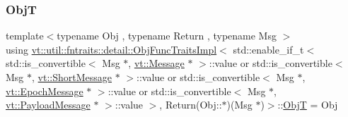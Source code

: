\subsubsection{\texorpdfstring{ObjT}{ObjT}}
{\footnotesize\ttfamily template$<$typename Obj , typename Return , typename Msg $>$ \\
using \hyperlink{structvt_1_1util_1_1fntraits_1_1detail_1_1_obj_func_traits_impl}{vt\+::util\+::fntraits\+::detail\+::\+Obj\+Func\+Traits\+Impl}$<$ std\+::enable\+\_\+if\+\_\+t$<$ std\+::is\+\_\+convertible$<$ Msg $\ast$, \hyperlink{namespacevt_a3a3ddfef40b4c90915fa43cdd5f129ea}{vt\+::\+Message} $\ast$ $>$\+::value or std\+::is\+\_\+convertible$<$ Msg $\ast$, \hyperlink{namespacevt_a1125ac1da6c0bbf141e0ea0739d7602d}{vt\+::\+Short\+Message} $\ast$ $>$\+::value or std\+::is\+\_\+convertible$<$ Msg $\ast$, \hyperlink{namespacevt_ad67368ffae52d7325002586b41bb150e}{vt\+::\+Epoch\+Message} $\ast$ $>$\+::value or std\+::is\+\_\+convertible$<$ Msg $\ast$, \hyperlink{namespacevt_a89a92229c5622b855c02c549f83a1a68}{vt\+::\+Payload\+Message} $\ast$ $>$\+::value $>$, Return(Obj\+::$\ast$)(Msg $\ast$)$>$\+::\hyperlink{structvt_1_1util_1_1fntraits_1_1detail_1_1_obj_func_traits_impl_3_01std_1_1enable__if__t_3_01stdc67616d674616ce71c363c0e039ceb56_a6b9210c366bdac4e516816ddcc87d5d5}{ObjT} =  Obj}

